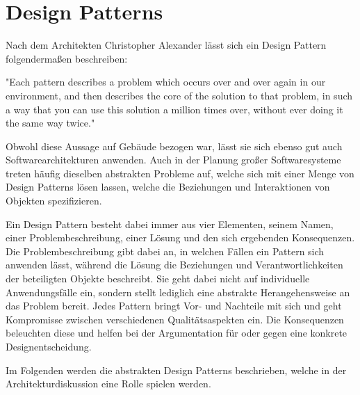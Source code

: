 \section{Design Patterns}

Nach dem Architekten Christopher Alexander lässt sich ein Design Pattern folgendermaßen beschreiben:

"Each pattern describes a problem which occurs over and over again in our environment, and then describes the core of the solution to that problem, in such a way that you can use this solution a million times over, without ever doing it the same way twice."

Obwohl diese Aussage auf Gebäude bezogen war, lässt sie sich ebenso gut auch Softwarearchitekturen anwenden. Auch in der Planung großer Softwaresysteme treten häufig dieselben abstrakten Probleme auf, welche sich mit einer Menge von Design Patterns lösen lassen, welche die Beziehungen und Interaktionen von Objekten spezifizieren.

Ein Design Pattern besteht dabei immer aus vier Elementen, seinem Namen, einer Problembeschreibung, einer Lösung und den sich ergebenden Konsequenzen. Die Problembeschreibung gibt dabei an, in welchen Fällen ein Pattern sich anwenden lässt, während die Lösung die Beziehungen und Verantwortlichkeiten der beteiligten Objekte beschreibt. Sie geht dabei nicht auf individuelle Anwendungsfälle ein, sondern stellt lediglich eine abstrakte Herangehensweise an das Problem bereit. Jedes Pattern bringt Vor- und Nachteile mit sich und geht Kompromisse zwischen verschiedenen Qualitätsaspekten ein. Die Konsequenzen beleuchten diese  und helfen bei der Argumentation für oder gegen eine konkrete Designentscheidung.

Im Folgenden werden die abstrakten Design Patterns beschrieben, welche in der Architekturdiskussion eine Rolle spielen werden.






